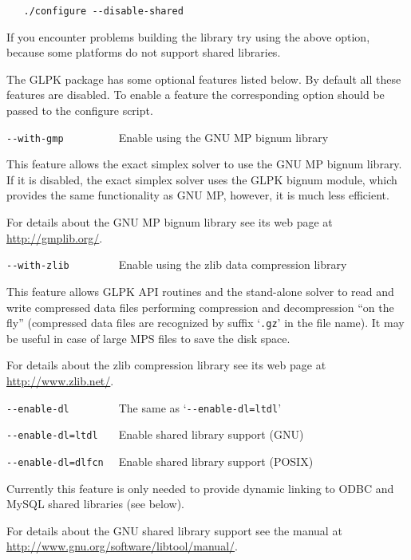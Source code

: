 \begin{verbatim}
   ./configure --disable-shared
\end{verbatim}

\noindent
If you encounter problems building the library try using the above
option, because some platforms do not support shared libraries.

\newpage

The GLPK package has some optional features listed below. By default
all these features are disabled. To enable a feature the corresponding
option should be passed to the configure script.

\bigskip

\noindent
\verb|--with-gmp         | Enable using the GNU MP bignum library

\medskip

This feature allows the exact simplex solver to use the GNU MP bignum
library. If it is disabled, the exact simplex solver uses the GLPK
bignum module, which provides the same functionality as GNU MP, however,
it is much less efficient.

For details about the GNU MP bignum library see its web page at
\url{http://gmplib.org/}.

\bigskip

\noindent
\verb|--with-zlib        |
Enable using the zlib data compression library

\medskip

This feature allows GLPK API routines and the stand-alone solver to
read and write compressed data files performing compression and
decompression ``on the fly'' (compressed data files are recognized by
suffix `\verb|.gz|' in the file name). It may be useful in case of
large MPS files to save the disk space.

For details about the zlib compression library see its web page at
\url{http://www.zlib.net/}.

\bigskip

\noindent
\verb|--enable-dl        | The same as `\verb|--enable-dl=ltdl|'

\noindent
\verb|--enable-dl=ltdl   | Enable shared library support (GNU)

\noindent
\verb|--enable-dl=dlfcn  | Enable shared library support (POSIX)

\medskip

Currently this feature is only needed to provide dynamic linking to
ODBC and MySQL shared libraries (see below).

For details about the GNU shared library support see the manual at
\url{http://www.gnu.org/software/libtool/manual/}.

